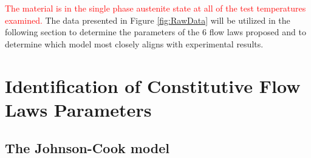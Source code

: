 \documentclass[metals,article,submit,pdftex,moreauthors]{Definitions/mdpi}
\begin{document}
\textcolor{red}{The material is in the single phase austenite state at all of the test temperatures examined.}
The data presented in Figure \ref{fig:RawData} will be utilized in the following section to determine the parameters of the $6$ flow laws proposed and to determine which model most closely aligns with experimental results.

\section{Identification of Constitutive Flow Laws Parameters\label{sec:ConstLaws}}
\subsection{The Johnson-Cook model\label{sec:JC}}
\end{document}
